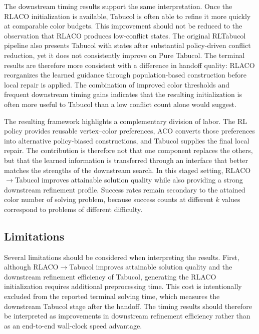 The downstream timing results support the same interpretation. Once the RLACO initialization is available, Tabucol is often able to refine it more quickly at comparable color budgets. This improvement should not be reduced to the observation that RLACO produces low-conflict states. The original RLTabucol pipeline also presents Tabucol with states after substantial policy-driven conflict reduction, yet it does not consistently improve on Pure Tabucol. The terminal results are therefore more consistent with a difference in handoff quality: RLACO reorganizes the learned guidance through population-based construction before local repair is applied. The combination of improved color thresholds and frequent downstream timing gains indicates that the resulting initialization is often more useful to Tabucol than a low conflict count alone would suggest.

The resulting framework highlights a complementary division of labor. The RL policy provides reusable vertex--color preferences, ACO converts those preferences into alternative policy-biased constructions, and Tabucol supplies the final local repair. The contribution is therefore not that one component replaces the others, but that the learned information is transferred through an interface that better matches the strengths of the downstream search. In this staged setting, RLACO$\rightarrow$Tabucol improves attainable solution quality while also providing a strong downstream refinement profile. Success rates remain secondary to the attained color number of solving problem, because success counts at different $k$ values correspond to problems of different difficulty.

\subsection{Limitations}
\label{ssec:discussion-limitations}

Several limitations should be considered when interpreting the results.
First, although RLACO$\rightarrow$Tabucol improves attainable solution
quality and the downstream refinement efficiency of Tabucol, generating
the RLACO initialization requires additional preprocessing time. This
cost is intentionally excluded from the reported terminal solving time,
which measures the downstream Tabucol stage after the handoff. The
timing results should therefore be interpreted as improvements in
downstream refinement efficiency rather than as an end-to-end
wall-clock speed advantage.


